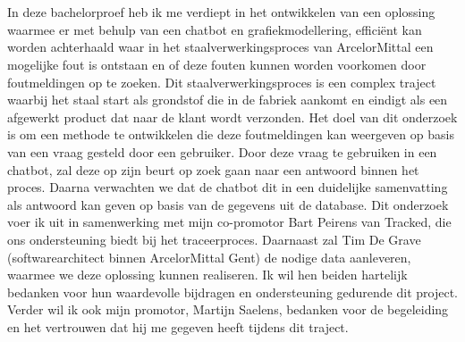 
\chapter*{}%
\label{ch:voorwoord}

In deze bachelorproef heb ik me verdiept in het ontwikkelen van een oplossing waarmee er met behulp van een chatbot en grafiekmodellering, efficiënt kan worden achterhaald waar in het staalverwerkingsproces van ArcelorMittal een mogelijke fout is ontstaan en of deze fouten kunnen worden voorkomen door foutmeldingen op te zoeken. 
Dit staalverwerkingsproces is een complex traject waarbij het staal start als grondstof die in de fabriek aankomt en eindigt als een afgewerkt product dat naar de klant wordt verzonden.
Het doel van dit onderzoek is om een methode te ontwikkelen die deze foutmeldingen kan weergeven op basis van een vraag gesteld door een gebruiker.
Door deze vraag te gebruiken in een chatbot, zal deze op zijn beurt op zoek gaan naar een antwoord binnen het proces. Daarna verwachten we dat de chatbot dit in een duidelijke samenvatting als antwoord kan geven op basis van de gegevens uit de database.
Dit onderzoek voer ik uit in samenwerking met mijn co-promotor Bart Peirens van Tracked, die ons ondersteuning biedt bij het traceerproces. 
Daarnaast zal Tim De Grave (softwarearchitect binnen ArcelorMittal Gent) de nodige data aanleveren, waarmee we deze oplossing kunnen realiseren. 
Ik wil hen beiden hartelijk bedanken voor hun waardevolle bijdragen en ondersteuning gedurende dit project. Verder wil ik ook mijn promotor, Martijn Saelens, bedanken voor de begeleiding en het vertrouwen dat hij me gegeven heeft tijdens dit traject.
